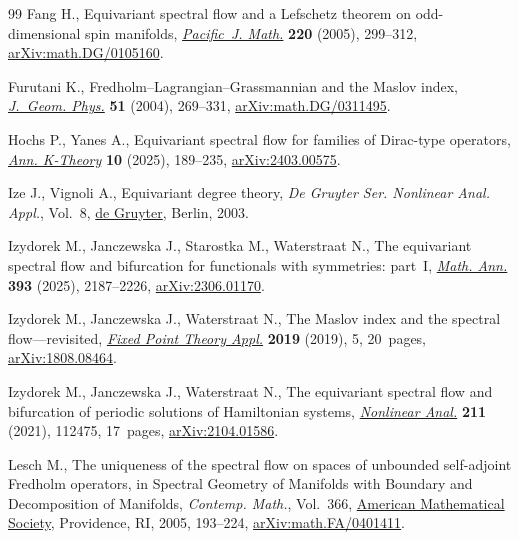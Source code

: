 \documentclass[pdftex]{sigma}
\numberwithin{equation}{section}
\theoremstyle{definition}
\begin{document}
\begin{thebibliography}{99}
Fang H., Equivariant spectral flow and a {L}efschetz theorem on odd-dimensional
 spin manifolds,
 \href{https://doi.org/10.2140/pjm.2005.220.299}{\textit{Pacific~J. Math.}}
 \textbf{220} (2005), 299--312,
 \href{http://arxiv.org/abs/math.DG/0105160}{arXiv:math.DG/0105160}.

Furutani K., Fredholm--{L}agrangian--{G}rassmannian and the {M}aslov index,
 \href{https://doi.org/10.1016/j.geomphys.2004.04.001}{\textit{J.~Geom.
 Phys.}} \textbf{51} (2004), 269--331,
 \href{http://arxiv.org/abs/math.DG/0311495}{arXiv:math.DG/0311495}.

Hochs P., Yanes A., Equivariant spectral flow for families of {D}irac-type
 operators, \href{https://doi.org/10.2140/akt.2025.10.189}{\textit{Ann.
 K-Theory}} \textbf{10} (2025), 189--235,
 \href{http://arxiv.org/abs/2403.00575}{arXiv:2403.00575}.

Ize J., Vignoli A., Equivariant degree theory, \textit{De Gruyter Ser.
 Nonlinear Anal. Appl.}, Vol.~8,
 \href{https://doi.org/10.1515/9783110200027}{de Gruyter},
 Berlin, 2003.

Izydorek M., Janczewska J., Starostka M., Waterstraat N., The equivariant
 spectral flow and bifurcation for functionals with symmetries: part~{I},
 \href{https://doi.org/10.1007/s00208-025-03291-7}{\textit{Math. Ann.}}
 \textbf{393} (2025), 2187--2226,
 \href{http://arxiv.org/abs/2306.01170}{arXiv:2306.01170}.

Izydorek M., Janczewska J., Waterstraat N., The {M}aslov index and the spectral
 flow---revisited,
 \href{https://doi.org/10.1186/s13663-019-0655-6}{\textit{Fixed Point Theory
 Appl.}} \textbf{2019} (2019), 5, 20~pages,
 \href{http://arxiv.org/abs/1808.08464}{arXiv:1808.08464}.

Izydorek M., Janczewska J., Waterstraat N., The equivariant spectral flow and
 bifurcation of periodic solutions of {H}amiltonian systems,
 \href{https://doi.org/10.1016/j.na.2021.112475}{\textit{Nonlinear Anal.}}
 \textbf{211} (2021), 112475, 17~pages,
 \href{http://arxiv.org/abs/2104.01586}{arXiv:2104.01586}.

Lesch M., The uniqueness of the spectral flow on spaces of unbounded
 self-adjoint {F}redholm operators, in Spectral Geometry of Manifolds with
 Boundary and Decomposition of Manifolds, \textit{Contemp. Math.}, Vol.~366,
 \href{https://doi.org/10.1090/conm/366/06730}{American Mathematical Society},
 Providence, RI, 2005, 193--224,
 \href{http://arxiv.org/abs/math.FA/0401411}{arXiv:math.FA/0401411}.


\end{thebibliography}
\end{document}
